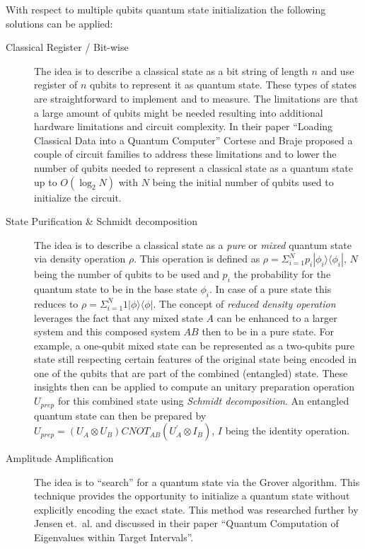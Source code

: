 With respect to multiple qubits quantum state initialization the following solutions can be applied:
\begin{description}
  \item[Classical Register / Bit-wise] The idea is to describe a classical state as a bit string of length $n$ and use register of $n$ qubits to represent it as quantum state. These types of states are straightforward to implement and to measure. The limitations are that a large amount of qubits might be needed resulting into additional hardware limitations and circuit complexity. In their paper \enquote{Loading Classical Data into a Quantum Computer} \cite{Corte_2018} Cortese and Braje proposed a couple of circuit families to address these limitations and to lower the number of qubits needed to represent a classical state as a quantum state up to $O(\log_2{N})$ \cite[p. 35]{Corte_2018} with $N$ being the initial number of qubits used to initialize the circuit.

  \item[State Purification \& Schmidt decomposition] The idea is to describe a classical state as a \emph{pure} or \emph{mixed} quantum state via density operation $\rho$. This operation is defined as $\rho = \Sigma_{i=1}^N p_i| \phi_i \rangle \langle \phi_i |$, $N$ being the number of qubits to be used and $p_i$ the probability for the quantum state to be in the base state $\phi_i$. In case of a pure state this reduces to $\rho = \Sigma_{i=1}^N 1| \phi \rangle \langle \phi |$. The concept of \emph{reduced density operation} leverages the fact that any mixed state $A$ can be enhanced to a larger system and this composed system $AB$ then to be in a pure state. \cite[pp. 98-109]{Niels_2010}\cite[p. 63]{Lokho_2020}\cite{Qtb_Densit} For example, a one-qubit mixed state can be represented as a two-qubits pure state still respecting certain features of the original state being encoded in one of the qubits that are part of the combined (entangled) state. These insights then can be applied to compute an unitary preparation operation $U_{prep}$ for this combined state using \emph{Schmidt decomposition}.\cite[pp. 109-111]{Niels_2010} An entangled quantum state can then be prepared by $U_{prep} = (U_A \otimes U_B) CNOT_{AB} (U_A^{'} \otimes I_B)$, $I$ being the identity operation. \cite[pp. 79-81]{Lokho_2020}

  \item[Amplitude Amplification] The idea is to \enquote{search} for a quantum state via the Grover algorithm. This technique provides the opportunity to initialize a quantum state without explicitly encoding the exact state. \cite[pp.3-4]{Daski_2015}\cite{Qtb_Grover} This method was researched further by Jensen et.~al. and discussed in their paper \enquote{Quantum Computation of Eigenvalues within Target Intervals}. \cite{Jense_2020}
\end{description}


